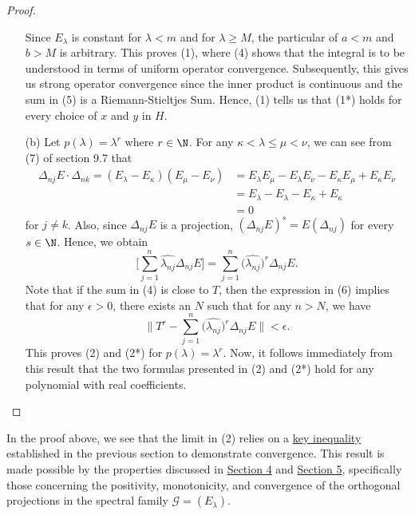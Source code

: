 \begin{proof}
\begin{enumerate}
        
        Since \( {E}_{\lambda} \) is constant for \( \lambda < m  \) and for \( \lambda \geq M  \), the particular of \( a < m  \) and \( b > M  \) is arbitrary. This proves (1), where (4) shows that the integral is to be understood in terms of uniform operator convergence. Subsequently, this gives us strong operator convergence  since the inner product is continuous and the sum in (5) is a Riemann-Stieltjes Sum. Hence, (1) tells us that (1*) holds for every choice of \( x  \) and \( y  \) in \( H  \).
    \item[(b)] Let \( p(\lambda) = \lambda^{r} \) where \( r \in \N \). For any \( \kappa < \lambda \leq \mu < \nu \), we can see from (7) of section 9.7 that 
        \begin{align*}
            \Delta_{nj} E  \cdot \Delta_{nk} =   ({E}_{\lambda} - {E}_{\kappa} ) ({E}_{\mu} - {E}_{\nu}) &= {E}_{\lambda} {E}_{\mu} - {E}_{\lambda } {E}_{\nu} - {E}_{\kappa} {E}_{\mu} + {E}_{\kappa} {E}_{\nu} \\
                                                                                                         &= {E}_{\lambda} - {E}_{\lambda} - {E}_{\kappa} + {E}_{\kappa} \\
                                                                                                         &= 0
        \end{align*}
        for \( j \neq k  \). Also, since \( {\Delta}_{nj} E  \) is a projection, \( (\Delta_{nj} E )^{s} = E (\Delta_{nj}) \) for every \( s \in \N  \). Hence, we obtain
        \[  \Big[ \sum_{ j=1  }^{ n } \hat{{\lambda}_{nj}} \Delta_{nj} E \Big] = \sum_{ j=1  }^{ n } \Big(\hat{{\lambda}_{nj}}\Big)^{r} \Delta_{nj} E.  \tag{6} \]
        Note that if the sum in (4) is close to \( T  \), then the expression in (6) implies that for any \( \epsilon > 0  \), there exists an \( N  \) such that for any \( n > N  \), we have 
        \[  \Big\|T^{r} - \sum_{ j=1  }^{ n } \Big(\hat{{\lambda}_{nj}}\Big)^{r}  \Delta_{nj} E \Big\| < \epsilon. \]
        This proves (2) and (2*) for \( p(\lambda) = \lambda^{r} \). Now, it follows immediately from this result that the two formulas presented in (2) and (2*) hold for any polynomial with real coefficients.
\end{enumerate}
\end{proof}

In the proof above, we see that the limit in (2) relies on a {\hyperref[dagger]{key inequality}} established in the previous section to demonstrate convergence. This result is made possible by the properties discussed in {\hyperref[section 4]{Section 4}} and {\hyperref[section 5]{Section 5}}, specifically those concerning the positivity, monotonicity, and convergence of the orthogonal projections in the spectral family \( \mathcal{G} = ({E}_{\lambda}) \).


